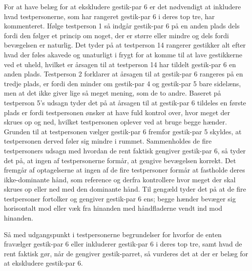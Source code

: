 For at have belæg for at ekskludere gestik-par 6 er det nødvendigt at inkludere hvad testpersonerne, som har rangeret gestik-par 6 i deres top tre, har kommenteret. Ifølge testperson 1 så indgår gestik-par 6 på en anden plads dels fordi den følger et princip om noget, der er større eller mindre og dels fordi bevægelsen er naturlig. Det tyder på at testperson 14 rangerer gestikker alt efter hvad der føles akavede og unaturligt i frygt for at komme til at lave gestikkerne ved et uheld, hvilket er årsagen til at testperson 14 har tildelt gestik-par 6 en anden plads. Testperson 2 forklarer at årsagen til at gestik-par 6 rangeres på en tredje plads, er fordi den minder om gestik-par 4 og gestik-par 5 bare sidelæns, men at det ikke giver lige så meget mening, som de to andre. Baseret på testperson 5's udsagn tyder det på at årsagen til at gestik-par 6 tildeles en første plads er fordi testpersonen ønsker at have fuld kontrol over, hvor meget der skrues op og ned, hvilket testpersonen oplever ved at bruge begge hænder. Grunden til at testpersonen vælger gestik-par 6 fremfor gestik-par 5 skyldes, at testpersonen derved føler sig mindre i rummet. Sammenholdes de fire testpersoners udsagn med hvordan de rent faktisk gengiver gestik-par 6, så tyder det på, at ingen af testpersonerne formår, at gengive bevægelsen korrekt. Det fremgår af optagelserne at ingen af de fire testpersoner formår at fastholde deres ikke-dominante hånd, som reference og derfra kontrollere hvor meget der skal skrues op eller ned med den dominante hånd. Til gengæld tyder det på at de fire testpersoner fortolker og gengiver gestik-par 6 ens; begge hænder bevæger sig horisontalt mod eller væk fra hinanden med håndfladerne vendt ind mod hinanden. 

Så med udgangspunkt i testpersonerne begrundelser for hvorfor de enten fravælger gestik-par 6 eller inkluderer gestik-par 6 i deres top tre, samt hvad de rent faktisk gør, når de gengiver gestik-parret, så vurderes det at der er belæg for at ekskludere gestik-par 6.  





